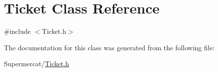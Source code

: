 \hypertarget{class_ticket}{}\section{Ticket Class Reference}
\label{class_ticket}


{\ttfamily \#include $<$Ticket.\+h$>$}



The documentation for this class was generated from the following file\+:\begin{DoxyCompactItemize}
\item 
Supermercat/\hyperlink{_ticket_8h}{Ticket.\+h}\end{DoxyCompactItemize}
